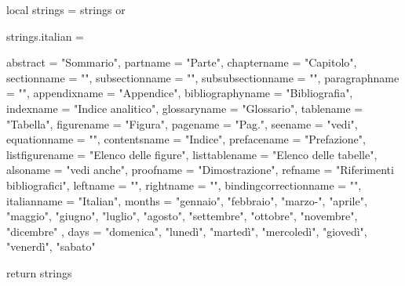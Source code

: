 local strings = strings or {}

strings.italian = {
  abstract          = "Sommario",
  partname          = "Parte",
  chaptername       = "Capitolo",
  sectionname       = "",
  subsectionname    = "",
  subsubsectionname = "",
  paragraphname     = "",
  appendixname      = "Appendice",
  bibliographyname  = "Bibliografia",
  indexname         = "Indice analitico",
  glossaryname      = "Glossario",
  tablename         = "Tabella",
  figurename        = "Figura",
  pagename          = "Pag.",
  seename           = "vedi",
  equationname      = "",
  contentsname      = "Indice",
  prefacename       = "Prefazione",
  listfigurename    = "Elenco delle figure",
  listtablename     = "Elenco delle tabelle",
  alsoname          = "vedi anche",
  proofname         = "Dimostrazione",
  refname           = "Riferimenti bibliografici",
  leftname          = "",
  rightname         = "",
  bindingcorrectionname = "",
  italianname         = "Italian",
  months              = {
    "gennaio",
    "febbraio",
    "marzo-",
    "aprile",
    "maggio",
    "giugno",
    "luglio",
    "agosto",
    "settembre",
    "ottobre",
    "novembre",
    "dicembre"
  },
  days = {
    "domenica",
    "lunedì",
    "martedì",
    "mercoledì",
    "giovedì",
    "venerdì",
    "sabato"}

}

return strings
